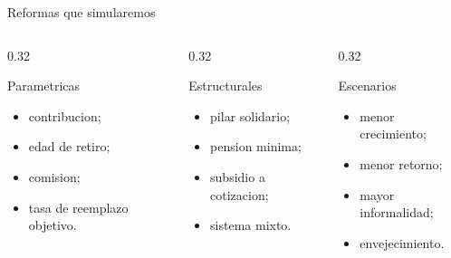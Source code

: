 \documentclass[10pt,aspectratio=169]{beamer}
\begin{document}
\begin{frame}{Reformas que simularemos}
\begin{columns}[T]
\begin{column}{0.32\textwidth}
\begin{block}{Parametricas}
\begin{itemize}
  \item contribucion;
  \item edad de retiro;
  \item comision;
  \item tasa de reemplazo objetivo.
\end{itemize}
\end{block}
\end{column}
\begin{column}{0.32\textwidth}
\begin{block}{Estructurales}
\begin{itemize}
  \item pilar solidario;
  \item pension minima;
  \item subsidio a cotizacion;
  \item sistema mixto.
\end{itemize}
\end{block}
\end{column}
\begin{column}{0.32\textwidth}
\begin{block}{Escenarios}
\begin{itemize}
  \item menor crecimiento;
  \item menor retorno;
  \item mayor informalidad;
  \item envejecimiento.
\end{itemize}
\end{block}
\end{column}
\end{columns}
\end{frame}
\end{document}
